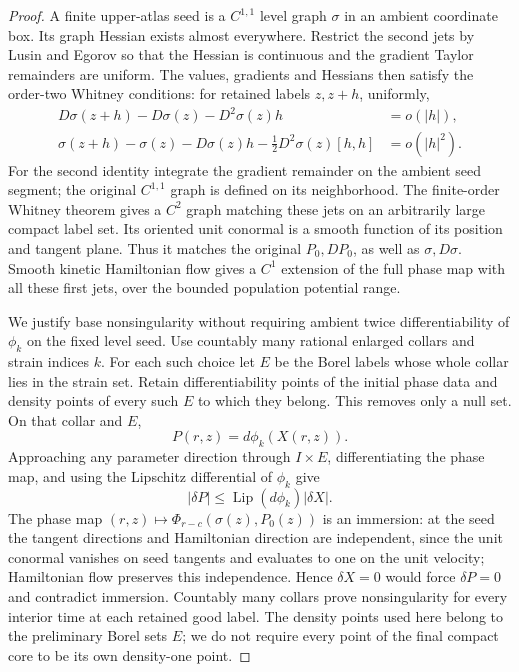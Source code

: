 \documentclass[11pt,reqno]{amsart}
\theoremstyle{definition}
\theoremstyle{remark}
\numberwithin{equation}{section}
\newcommand{\Lip}{\operatorname{Lip}}
\begin{document}
\begin{proof}
A finite upper-atlas seed is a \(C^{1,1}\) level graph \(\sigma\) in an
ambient coordinate box. Its graph Hessian exists almost everywhere.
Restrict the second jets by Lusin and Egorov so that the Hessian is
continuous and the gradient Taylor remainders are uniform. The values,
gradients and Hessians then satisfy the order-two Whitney conditions:
for retained labels \(z,z+h\), uniformly,
\[
 \begin{split}
 D\sigma(z+h)-D\sigma(z)-D^2\sigma(z)h&=o(|h|),\\
 \sigma(z+h)-\sigma(z)-D\sigma(z)h
                  -\tfrac12D^2\sigma(z)[h,h]&=o(|h|^2).
 \end{split}
\]
For the second identity integrate the gradient remainder on the ambient
seed segment; the original \(C^{1,1}\) graph is defined on its neighborhood.
The finite-order Whitney theorem gives a \(C^2\) graph matching these jets
on an arbitrarily large compact label set. Its oriented unit conormal is
a smooth function of its position and tangent plane. Thus it matches the
original \(P_0,DP_0\), as well as \(\sigma,D\sigma\). Smooth kinetic
Hamiltonian flow gives a \(C^1\) extension of the full phase map with all
these first jets, over the bounded population potential range.

We justify base nonsingularity without requiring ambient twice
differentiability of \(\phi_k\) on the fixed level seed. Use countably
many rational enlarged collars and strain indices \(k\). For each such
choice let \(E\) be the Borel labels whose whole collar lies in the strain
set. Retain differentiability points of the initial phase data and density
points of every such \(E\) to which they belong. This removes only a null
set. On that collar and \(E\),
\[
 P(r,z)=d\phi_k(X(r,z)).
\]
Approaching any parameter direction through \(I\times E\), differentiating
the phase map, and using the Lipschitz differential of \(\phi_k\) give
\begin{equation}
\label{general-gluing-phase-domination}
 |\delta P|\le\Lip(d\phi_k)|\delta X|.
\end{equation}
The phase map \((r,z)\mapsto\Phi_{r-c}(\sigma(z),P_0(z))\) is an
immersion: at the seed the tangent directions and Hamiltonian direction
are independent, since the unit conormal vanishes on seed tangents and
evaluates to one on the unit velocity; Hamiltonian flow preserves this
independence. Hence \(\delta X=0\) would force \(\delta P=0\) and
contradict immersion. Countably many collars prove nonsingularity for
every interior time at each retained good label. The density points used
here belong to the preliminary Borel sets \(E\); we do not require every
point of the final compact core to be its own density-one point.


\end{proof}
\end{document}
